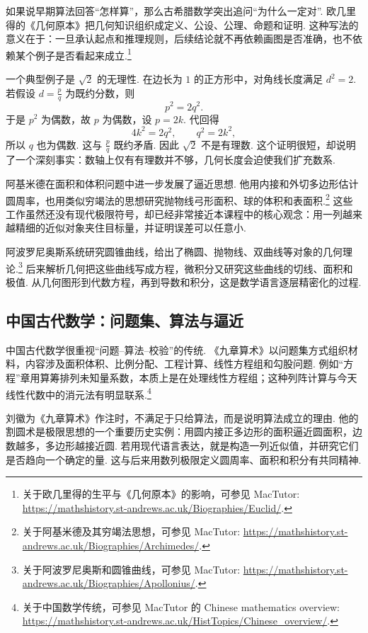 \documentclass[fontset=fandol]{ctexart}
\begin{document}
如果说早期算法回答“怎样算”，那么古希腊数学突出追问“为什么一定对”. 欧几里得的《几何原本》把几何知识组织成定义、公设、公理、命题和证明. 这种写法的意义在于：一旦承认起点和推理规则，后续结论就不再依赖画图是否准确，也不依赖某个例子是否看起来成立.\footnote{关于欧几里得的生平与《几何原本》的影响，可参见 MacTutor: \url{https://mathshistory.st-andrews.ac.uk/Biographies/Euclid/}.}

一个典型例子是 $\sqrt2$ 的无理性. 在边长为 $1$ 的正方形中，对角线长度满足 $d^2=2$. 若假设 $d=\frac pq$ 为既约分数，则
\[
p^2=2q^2.
\]
于是 $p^2$ 为偶数，故 $p$ 为偶数，设 $p=2k$. 代回得
\[
4k^2=2q^2,\qquad q^2=2k^2,
\]
所以 $q$ 也为偶数. 这与 $\frac pq$ 既约矛盾. 因此 $\sqrt2$ 不是有理数. 这个证明很短，却说明了一个深刻事实：数轴上仅有有理数并不够，几何长度会迫使我们扩充数系.

阿基米德在面积和体积问题中进一步发展了逼近思想. 他用内接和外切多边形估计圆周率，也用类似穷竭法的思想研究抛物线弓形面积、球的体积和表面积.\footnote{关于阿基米德及其穷竭法思想，可参见 MacTutor: \url{https://mathshistory.st-andrews.ac.uk/Biographies/Archimedes/}.} 这些工作虽然还没有现代极限符号，却已经非常接近本课程中的核心观念：用一列越来越精细的近似对象夹住目标量，并证明误差可以任意小.

阿波罗尼奥斯系统研究圆锥曲线，给出了椭圆、抛物线、双曲线等对象的几何理论.\footnote{关于阿波罗尼奥斯和圆锥曲线，可参见 MacTutor: \url{https://mathshistory.st-andrews.ac.uk/Biographies/Apollonius/}.} 后来解析几何把这些曲线写成方程，微积分又研究这些曲线的切线、面积和极值. 从几何图形到代数方程，再到导数和积分，这是数学语言逐层精密化的过程.

\subsection{中国古代数学：问题集、算法与逼近}

中国古代数学很重视“问题--算法--校验”的传统. 《九章算术》以问题集方式组织材料，内容涉及面积体积、比例分配、工程计算、线性方程组和勾股问题. 例如“方程”章用算筹排列未知量系数，本质上是在处理线性方程组；这种列阵计算与今天线性代数中的消元法有明显联系.\footnote{关于中国数学传统，可参见 MacTutor 的 Chinese mathematics overview: \url{https://mathshistory.st-andrews.ac.uk/HistTopics/Chinese_overview/}.}

刘徽为《九章算术》作注时，不满足于只给算法，而是说明算法成立的理由. 他的割圆术是极限思想的一个重要历史实例：用圆内接正多边形的面积逼近圆面积，边数越多，多边形越接近圆. 若用现代语言表达，就是构造一列近似值，并研究它们是否趋向一个确定的量. 这与后来用数列极限定义圆周率、面积和积分有共同精神.
\end{document}

